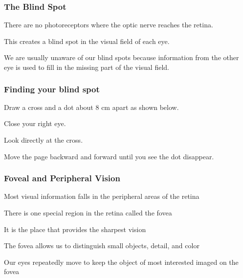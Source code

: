 \documentclass[12pt]{beamer}\usepackage[]{graphicx}\usepackage[]{color}
\begin{document}

\begin{frame}
\begin{center}
\Huge{}
\end{center}
\end{frame}


\begin{frame}
\frametitle{The Blind Spot}

\bbi
  \item There are no photoreceptors where the optic nerve reaches the retina.
  \item This creates a blind spot in the visual field of each eye.
  
  \item We are usually unaware of our blind spots because information from the 
  other eye is used to fill in the missing part of the visual field.
\ei

\end{frame}


\begin{frame}
\frametitle{Finding your blind spot}

\bi
  \item Draw a cross and a dot about 8 cm apart as shown below.
  \item Close your right eye.
  \item Look directly at the cross.
  \item Move the page backward and forward until you see the dot disappear.
\ei

\begin{center}
\end{center}

\end{frame}


\begin{frame}
\frametitle{Foveal and Peripheral Vision}

\bbi
  \item Most visual information falls in the peripheral areas of the retina
  \item There is one special region in the retina called the fovea 
  \item It is the place that provides the sharpest vision
  \item The fovea allows us to distinguish small objects, detail, and color
  \item Our eyes repeatedly move to keep the object of most interested imaged
  on the fovea
\ei

\end{frame}
\end{document}
